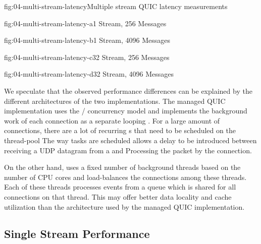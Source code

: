\begin{myFigure}{fig:04-multi-stream-latency}{Multiple stream QUIC latency measurements}
\begin{mySubfigure}{0.49\linewidth}{fig:04-multi-stream-latency-a}{1 Stream, \SI{256}{\byte} Messages}
\footnotesize

\end{mySubfigure}
\begin{mySubfigure}{0.49\linewidth}{fig:04-multi-stream-latency-b}{1 Stream, \SI{4096}{\byte} Messages}
\footnotesize

\end{mySubfigure}

\begin{mySubfigure}{0.49\linewidth}{fig:04-multi-stream-latency-c}{32 Stream, \SI{256}{\byte} Messages}
\footnotesize

\end{mySubfigure}
\begin{mySubfigure}{0.49\linewidth}{fig:04-multi-stream-latency-d}{32 Stream, \SI{4096}{\byte} Messages}
\footnotesize

\end{mySubfigure}
\end{myFigure}

We speculate that the observed performance differences can be explained by the different
architectures of the two implementations. The managed QUIC implementation uses the \dotnet{}
/ concurrency model and implements the background work of each
connection as a separate looping . For a large amount of connections, there are a lot of
recurring s that need to be scheduled on the \dotnet{} thread-pool The way tasks are
scheduled allows a delay to be introduced between receiving a UDP datagram from a \Socket{} and
Processing the packet by the connection.

On the other hand, \libmsquic{} uses a fixed number of background threads based on the number of CPU
cores and load-balances the connections among these threads. Each of these threads processes events
from a queue which is shared for all connections on that thread. This may offer better data locality
and cache utilization than the architecture used by the managed QUIC implementation.

\subsection{Single Stream Performance}

